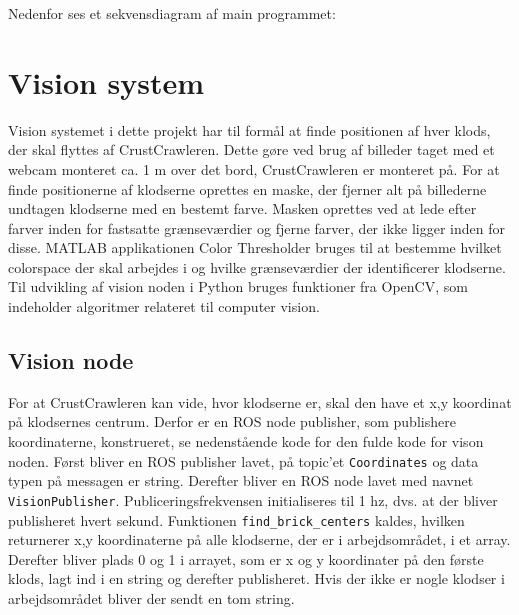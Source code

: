 Nedenfor ses et sekvensdiagram af main programmet:


\newpage
\section{Vision system}
Vision systemet i dette projekt har til formål at finde positionen af hver klods, der skal flyttes af CrustCrawleren.
Dette gøre ved brug af billeder taget med et webcam monteret ca. 1 m over det bord, CrustCrawleren er monteret på.
For at finde positionerne af klodserne oprettes en maske, der fjerner alt på billederne undtagen klodserne med en bestemt farve.
Masken oprettes ved at lede efter farver inden for fastsatte grænseværdier og fjerne farver, der ikke ligger inden for disse.
MATLAB applikationen Color Thresholder bruges til at bestemme hvilket colorspace der skal arbejdes i og hvilke grænseværdier der identificerer klodserne.
Til udvikling af vision noden i Python bruges funktioner fra OpenCV, som indeholder algoritmer relateret til computer vision.

\subsection{Vision node}
For at CrustCrawleren kan vide, hvor klodserne er, skal den have et x,y koordinat på klodsernes centrum.
Derfor er en ROS node publisher, som publishere koordinaterne, konstrueret, se nedenstående kode for den fulde kode for vison noden.
Først bliver en ROS publisher lavet, på topic'et \texttt{Coordinates} og data typen på messagen er string.
Derefter bliver en ROS node lavet med navnet \texttt{VisionPublisher}.
Publiceringsfrekvensen initialiseres til 1 hz, dvs. at der bliver publisheret hvert sekund. \newline
Funktionen \texttt{find\_brick\_centers} kaldes, hvilken returnerer x,y koordinaterne på alle klodserne, der er i arbejdsområdet, i et array.
Derefter bliver plads 0 og 1 i arrayet, som er x og y koordinater på den første klods, lagt ind i en string og derefter publisheret.
Hvis der ikke er nogle klodser i arbejdsområdet bliver der sendt en tom string.


